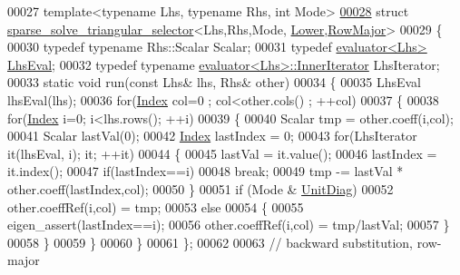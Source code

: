 \begin{DoxyCode}
00027 \textcolor{keyword}{template}<\textcolor{keyword}{typename} Lhs, \textcolor{keyword}{typename} Rhs, \textcolor{keywordtype}{int} Mode>
\hyperlink{struct_eigen_1_1internal_1_1sparse__solve__triangular__selector_3_01_lhs_00_01_rhs_00_01_mode_00_01_lower_00_01_row_major_01_4}{00028} \textcolor{keyword}{struct }\hyperlink{struct_eigen_1_1internal_1_1sparse__solve__triangular__selector}{sparse\_solve\_triangular\_selector}<Lhs,Rhs,Mode,
      \hyperlink{group__enums_gga39e3366ff5554d731e7dc8bb642f83cda891792b8ed394f7607ab16dd716f60e6}{Lower},\hyperlink{group__enums_ggaacded1a18ae58b0f554751f6cdf9eb13acfcde9cd8677c5f7caf6bd603666aae3}{RowMajor}>
00029 \{
00030   \textcolor{keyword}{typedef} \textcolor{keyword}{typename} Rhs::Scalar Scalar;
00031   \textcolor{keyword}{typedef} \hyperlink{struct_eigen_1_1internal_1_1evaluator}{evaluator<Lhs>} \hyperlink{struct_eigen_1_1internal_1_1evaluator}{LhsEval};
00032   \textcolor{keyword}{typedef} \textcolor{keyword}{typename} \hyperlink{struct_eigen_1_1internal_1_1evaluator}{evaluator<Lhs>::InnerIterator} LhsIterator;
00033   \textcolor{keyword}{static} \textcolor{keywordtype}{void} run(\textcolor{keyword}{const} Lhs& lhs, Rhs& other)
00034   \{
00035     LhsEval lhsEval(lhs);
00036     \textcolor{keywordflow}{for}(\hyperlink{namespace_eigen_a62e77e0933482dafde8fe197d9a2cfde}{Index} col=0 ; col<other.cols() ; ++col)
00037     \{
00038       \textcolor{keywordflow}{for}(\hyperlink{namespace_eigen_a62e77e0933482dafde8fe197d9a2cfde}{Index} i=0; i<lhs.rows(); ++i)
00039       \{
00040         Scalar tmp = other.coeff(i,col);
00041         Scalar lastVal(0);
00042         \hyperlink{namespace_eigen_a62e77e0933482dafde8fe197d9a2cfde}{Index} lastIndex = 0;
00043         \textcolor{keywordflow}{for}(LhsIterator it(lhsEval, i); it; ++it)
00044         \{
00045           lastVal = it.value();
00046           lastIndex = it.index();
00047           \textcolor{keywordflow}{if}(lastIndex==i)
00048             \textcolor{keywordflow}{break};
00049           tmp -= lastVal * other.coeff(lastIndex,col);
00050         \}
00051         \textcolor{keywordflow}{if} (Mode & \hyperlink{group__enums_gga39e3366ff5554d731e7dc8bb642f83cdaddb72f888ac85d5a1c52333e54f9374b}{UnitDiag})
00052           other.coeffRef(i,col) = tmp;
00053         \textcolor{keywordflow}{else}
00054         \{
00055           eigen\_assert(lastIndex==i);
00056           other.coeffRef(i,col) = tmp/lastVal;
00057         \}
00058       \}
00059     \}
00060   \}
00061 \};
00062 
00063 \textcolor{comment}{// backward substitution, row-major}

\end{DoxyCode}
